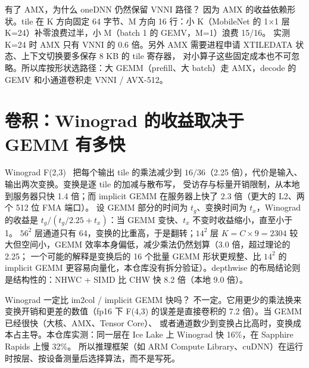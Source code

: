\documentclass[11pt,a4paper]{ctexart}
\begin{document}
\begin{iqbox}{有了 AMX，为什么 oneDNN 仍然保留 VNNI 路径？}
因为 AMX 的收益依赖形状。tile 在 K 方向固定 64 字节、M 方向 16 行：小 K（MobileNet 的 1×1 层 K=24）补零浪费过半，小 M（batch 1 的 GEMV，M=1）浪费 15/16。
实测 K=24 时 AMX 只有 VNNI 的 0.6 倍。另外 AMX 需要进程申请 XTILEDATA 状态、上下文切换要多保存 8 KB 的 tile 寄存器，
对小算子这些固定成本也不可忽略。所以库按形状选路径：大 GEMM（prefill、大 batch）走 AMX，decode 的 GEMV 和小通道卷积走 VNNI / AVX-512。
\end{iqbox}

\section{卷积：Winograd 的收益取决于 GEMM 有多快}\label{sec:conv}

\begin{table}[H]
\centering\small
\caption{ResNet 3×3 卷积单线程 GFLOP/s（Winograd 按直接卷积 FLOP 计等效值）}\label{tab:conv}
\end{table}

Winograd F(2,3)~\cite{lavin2016} 把每个输出 tile 的乘法减少到 $16/36$（2.25 倍），代价是输入、输出两次变换。变换是逐 tile 的加减与散布写，
受访存与标量开销限制，从本地到服务器只快 1.4 倍；而 implicit GEMM 在服务器上快了 2.3 倍（更大的 L2、两个 512 位 FMA 端口）。
设 GEMM 部分的时间为 $t_g$、变换时间为 $t_x$，Winograd 的收益是 $t_g / (t_g/2.25 + t_x)$：当 GEMM 变快、$t_x$ 不变时收益缩小，直至小于 1。
$56^2$ 层通道只有 64，变换的比重高，于是翻转；$14^2$ 层 $K = C\times9 = 2304$ 较大但空间小，GEMM 效率本身偏低，减少乘法仍然划算（3.0 倍，超过理论的 2.25；
一个可能的解释是变换后的 16 个批量 GEMM 形状更规整、比 $14^2$ 的 implicit GEMM 更容易向量化，本仓库没有拆分验证）。depthwise 的布局结论则是结构性的：NHWC + SIMD 比 CHW 快 8.2 倍（本地 9.0 倍）。

\begin{iqbox}{Winograd 一定比 im2col / implicit GEMM 快吗？}
不一定。它用更少的乘法换来变换开销和更差的数值（fp16 下 F(4,3) 的误差是直接卷积的 7.2 倍）。当 GEMM 已经很快（大核、AMX、Tensor Core）、
或者通道数少到变换占比高时，变换成本占主导。本仓库实测：同一层在 Ice Lake 上 Winograd 快 16\%，在 Sapphire Rapids 上慢 32\%。
所以推理框架（如 ARM Compute Library、cuDNN）在运行时按层、按设备测量后选择算法，而不是写死。
\end{iqbox}
\end{document}
